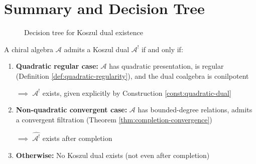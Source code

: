 
\section{Summary and Decision Tree}
\label{sec:existence-summary}

\begin{figure}[H]
\centering
{}
\caption{Decision tree for Koszul dual existence}
\label{fig:decision-tree-existence}
\end{figure}

\begin{theorem}\label{thm:existence-summary}
A chiral algebra $\mathcal{A}$ admits a Koszul dual $\mathcal{A}^!$ if and only if:
\begin{enumerate}
\item \textbf{Quadratic regular case:} $\mathcal{A}$ has quadratic presentation, 
      is regular (Definition \ref{def:quadratic-regularity}), and the dual coalgebra 
      is conilpotent
      
      $\implies$ $\mathcal{A}^!$ exists, given explicitly by Construction \ref{const:quadratic-dual}
      
\item \textbf{Non-quadratic convergent case:} $\mathcal{A}$ has bounded-degree 
      relations, admits a convergent filtration (Theorem \ref{thm:completion-convergence})
      
      $\implies$ $\widehat{\mathcal{A}^!}$ exists after completion
      
\item \textbf{Otherwise:} No Koszul dual exists (not even after completion)
\end{enumerate}
\end{theorem}

